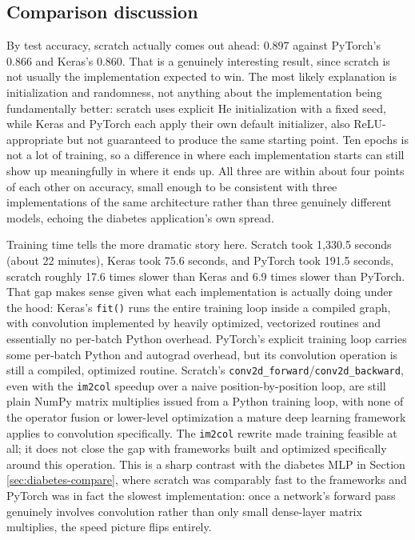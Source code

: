 \documentclass[11pt]{article}
\newcommand{\code}[1]{\texttt{#1}}
\begin{document}
\subsection{Comparison discussion}
\label{sec:fm-compare}

By test accuracy, scratch actually comes out ahead: 0.897 against PyTorch's
0.866 and Keras's 0.860. That is a genuinely interesting result, since
scratch is not usually the implementation expected to win. The most likely
explanation is initialization and randomness, not anything about the
implementation being fundamentally better: scratch uses explicit He
initialization with a fixed seed, while Keras and PyTorch each apply their
own default initializer, also ReLU-appropriate but not guaranteed to produce
the same starting point. Ten epochs is not a lot of training, so a difference
in where each implementation starts can still show up meaningfully in where
it ends up. All three are within about four points of each other on
accuracy, small enough to be consistent with three implementations of the
same architecture rather than three genuinely different models, echoing the
diabetes application's own spread.

Training time tells the more dramatic story here. Scratch took 1,330.5
seconds (about 22 minutes), Keras took 75.6 seconds, and PyTorch took 191.5
seconds, scratch roughly 17.6 times slower than Keras and 6.9 times slower
than PyTorch. That gap makes sense given what each implementation is
actually doing under the hood: Keras's \code{fit()} runs the entire training
loop inside a compiled graph, with convolution implemented by heavily
optimized, vectorized routines and essentially no per-batch Python overhead.
PyTorch's explicit training loop carries some per-batch Python and autograd
overhead, but its convolution operation is still a compiled, optimized
routine. Scratch's \code{conv2d\_forward}/\code{conv2d\_backward}, even with
the \code{im2col} speedup over a naive position-by-position loop, are still
plain NumPy matrix multiplies issued from a Python training loop, with none
of the operator fusion or lower-level optimization a mature deep learning
framework applies to convolution specifically. The \code{im2col} rewrite
made training feasible at all; it does not close the gap with frameworks
built and optimized specifically around this operation. This is a sharp
contrast with the diabetes MLP in Section \ref{sec:diabetes-compare}, where
scratch was comparably fast to the frameworks and PyTorch was in fact the
slowest implementation: once a network's forward pass genuinely involves
convolution rather than only small dense-layer matrix multiplies, the
speed picture flips entirely.
\end{document}
